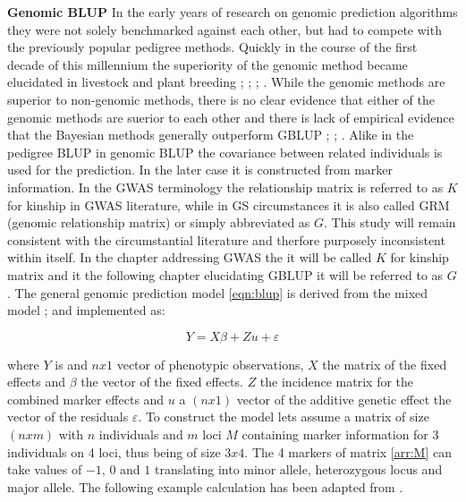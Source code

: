 \textbf{Genomic BLUP} \newline In the early years of research on genomic prediction algorithms they were not
solely benchmarked against each other, but had to compete with the previously popular pedigree
methods. Quickly in the course of the first decade of this millennium the superiority of the genomic method
became elucidated in livestock and plant breeding \cite{habier2007impact}; \cite{vanraden2008efficient};
\cite{vanraden2008reliability}; \cite{harris2009genomic}.  While the genomic methods are superior to
non-genomic methods, there is no clear evidence that either of the genomic methods are suerior to each other
and there is lack of empirical evidence that the Bayesian methods generally outperform GBLUP
\cite{moser2009comparison} ; \cite{bernardo2010breeding}; \cite{azodi2019}.  Alike in the pedigree BLUP in
genomic BLUP the covariance between related individuals is used for the prediction. In the later case it is
constructed from marker information. In the GWAS terminology the relationship matrix is referred to as $K$ for
kinship in GWAS literature, while in GS circumstances it is also called GRM (genomic relationship matrix) or
simply abbreviated as $G$. This study will remain consistent with the circumstantial literature and therfore purposely inconsistent within itself. In the chapter addressing GWAS the it will be called $K$ for kinship matrix and it the following chapter elucidating GBLUP it will be referred to as $G$.
The general genomic prediction model \ref{eqn:blup} is derived from the mixed model \cite{henderson1975best};
\cite{vanraden2008efficient} and implemented as:

\begin{equation}
Y = X \beta  +  Zu + \varepsilon
  \label{eqn:blup}
\end{equation}

where $Y$ is and $nx1$ vector of phenotypic observations, $X$ the matrix of the fixed effects and $\beta$ the
vector of the fixed effects. $Z$ the incidence matrix for the combined marker effects and $u$ a $(nx1)$ vector
of the additive genetic effect the vector of the residuals $\varepsilon$.  To construct the model lets assume
a matrix of size $(n x m)$ with $n$ individuals and $m$ loci $M$ containing marker information for 3
individuals on 4 loci, thus being of size $3x4$. The 4 markers of matrix \ref{arr:M} can take values of $-1$,
$0$ and $1$ translating into minor allele, heterozygous locus and major allele. The following example
calculation has been adapted from \cite{isik2013}.

